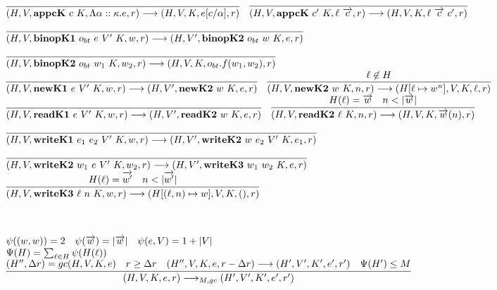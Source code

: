 \documentclass[fleqn]{article}
\begin{document}
\[\begin{array}{l}
\infer{(H,V,\mathbf{appcK}~c~K,\Lambda \alpha::\kappa. e, r) \longrightarrow (H,V,K,e[c/\alpha],r)}{\vspace{1em}} \hspace{1em}
\infer{(H,V,\mathbf{appcK}~c'~K,\ell~\overrightarrow{c},r) \longrightarrow (H,V,K,\ell~\overrightarrow{c}~c',r)}{\vspace{1em}} \\
\infer{(H,V,\mathbf{binopK1}~o_{bt}~e~V'~K,w,r) \longrightarrow (H,V',\mathbf{binopK2}~o_{bt}~w~K,e,r)}{\vspace{1em}}	\\
\infer{(H,V,\mathbf{binopK2}~o_{bt}~w_1~K,w_2,r) \longrightarrow (H,V,K,o_{bt}.f(w_1,w_2),r)}{\vspace{1em}} \\
\infer{(H,V,\mathbf{newK1}~e~V'~K,w,r) \longrightarrow (H,V',\mathbf{newK2}~w~K,e,r)}{\vspace{1em}} \hspace{1em}
\infer{(H,V,\mathbf{newK2}~w~K,n,r) \longrightarrow (H[\ell \mapsto w^n],V,K,\ell,r)}{\ell \not\in H} \\
\infer{(H,V,\mathbf{readK1}~e~V'~K,w,r) \longrightarrow (H,V',\mathbf{readK2}~w~K,e,r)}{\vspace{1em}} \hspace{1em}
\infer{(H,V,\mathbf{readK2}~\ell~K,n,r) \longrightarrow (H,V,K,\overrightarrow{w}(n),r)}{H(\ell) = \overrightarrow{w} & n < |\overrightarrow{w}|} \\
\infer{(H,V,\mathbf{writeK1}~e_1~e_2~V'~K,w,r) \longrightarrow (H,V',\mathbf{writeK2}~w~e_2~V'~K,e_1,r)}{\vspace{1em}} \\
\infer{(H,V,\mathbf{writeK2}~w_1~e~V'~K,w_2,r) \longrightarrow (H,V',\mathbf{writeK3}~w_1~w_2~K,e,r)}{\vspace{1em}} \\
\infer{(H,V,\mathbf{writeK3}~\ell~n~K,w,r) \longrightarrow (H[(\ell,n) \mapsto w],V,K,(),r)}{H(\ell) = \overrightarrow{w'} & n < |\overrightarrow{w'}|} \\
\\
\\
\\
\psi((w,w)) = 2 \hspace{1em} \psi(\overrightarrow{w}) = |\overrightarrow{w}| \hspace{1em} \psi(e,V)=1+|V| \\
\Psi(H) = \sum_{\ell \in H} \psi(H(\ell)) \\
\infer{(H,V,K,e,r) \longrightarrow_{M,gc} (H',V',K',e',r')}{(H'',\Delta r) = gc(H,V,K,e) & r \ge \Delta r & (H'',V,K,e,r-\Delta r) \longrightarrow (H',V',K',e',r') & \Psi(H') \le M} \\

\end{array}\]
\end{document}
